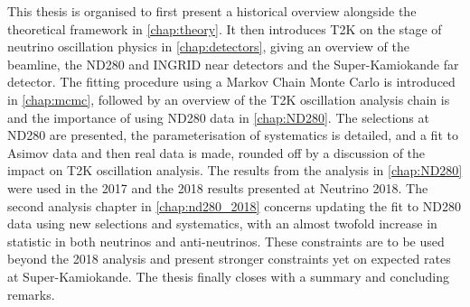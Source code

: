 This thesis is organised to first present a historical overview alongside the theoretical framework in \autoref{chap:theory}. It then introduces T2K on the stage of neutrino oscillation physics in \autoref{chap:detectors}, giving an overview of the beamline, the ND280 and INGRID near detectors and the Super-Kamiokande far detector. The fitting procedure using a Markov Chain Monte Carlo is introduced in \autoref{chap:mcmc}, followed by an overview of the T2K oscillation analysis chain is and the importance of using ND280 data in \autoref{chap:ND280}. The selections at ND280 are presented, the parameterisation of systematics is detailed, and a fit to Asimov data and then real data is made, rounded off by a discussion of the impact on T2K oscillation analysis. The results from the analysis in \autoref{chap:ND280} were used in the 2017\cite{t2k_2017} and the 2018 results presented at Neutrino 2018\cite{t2k_neutrino2018}. The second analysis chapter in \autoref{chap:nd280_2018} concerns updating the fit to ND280 data using new selections and systematics, with an almost twofold increase in statistic in both neutrinos and anti-neutrinos. These constraints are to be used beyond the 2018 analysis and present stronger constraints yet on expected rates at Super-Kamiokande. The thesis finally closes with a summary and concluding remarks.
